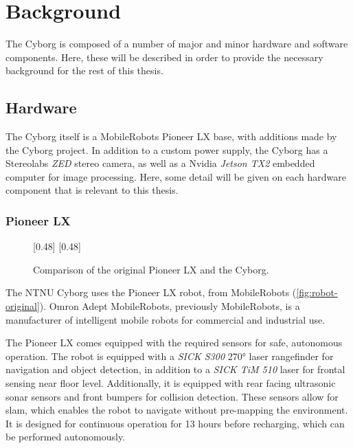 \documentclass[\rootfolder/main.tex]{subfiles}
\begin{document}
\chapter{Background}
\label{ch:background}

The Cyborg is composed of a number of major and minor hardware and software components.
Here, these will be described in order to provide the necessary background for the rest of this thesis.


\section{Hardware}

The Cyborg itself is a MobileRobots Pioneer LX base, with additions made by the Cyborg project.
In addition to a custom power supply, the Cyborg has a Stereolabs \emph{ZED} stereo camera, as well as a Nvidia \emph{Jetson TX2} embedded computer for image processing.
Here, some detail will be given on each hardware component that is relevant to this thesis.


\subsection{Pioneer LX}

\begin{figure}[h]
    \centering
    [0.48\columnwidth]{}%
    [0.48\columnwidth]{}
    \caption{Comparison of the original Pioneer LX and the Cyborg.\label{fig:robot-comparison}}
\end{figure}

The NTNU Cyborg uses the Pioneer LX robot, from MobileRobots (\cref{fig:robot-original}).
Omron Adept MobileRobots, previously MobileRobots, is a manufacturer of intelligent mobile robots for commercial and industrial use.

The Pioneer LX comes equipped with the required sensors for safe, autonomous operation.
The robot is equipped with a \emph{SICK S300} \ang{270} laser rangefinder for navigation and object detection, in addition to a \emph{SICK TiM 510} laser for frontal sensing near floor level.
Additionally, it is equipped with rear facing ultrasonic sonar sensors and front bumpers for collision detection.
These sensors allow for \acrfull{slam}, which enables the robot to navigate without pre-mapping the environment.
It is designed for continuous operation for 13 hours before recharging, which can be performed autonomously.
\end{document}
